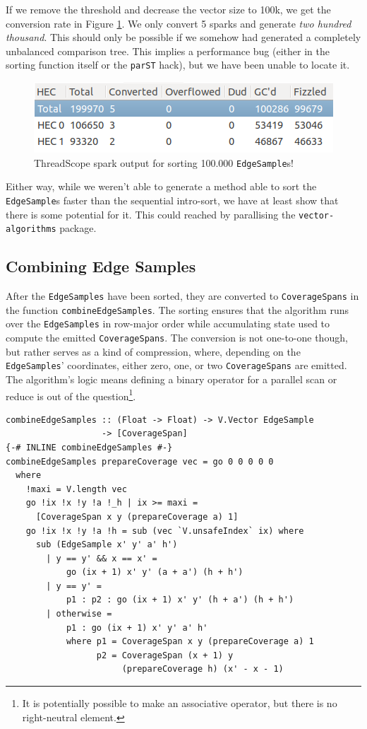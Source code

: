 \documentclass[12pt, a4paper]{article}
\begin{document}
If we remove the threshold and decrease the vector size to 100k, we get the conversion rate in
Figure \ref{fig:sorting-thread-100k-sparks}. We only convert 5 sparks and generate \textit{two hundred thousand}. This should only be possible if we somehow had generated
a completely unbalanced comparison tree. This implies a performance bug (either in the sorting function
 itself or the \texttt{parST} hack), but we have been unable to locate it.
 \begin{figure}[h!]
  \centering
  \includegraphics[width=0.6\linewidth]{../threadscope/sorting/sorting-100k-sparks}
  \caption{ThreadScope spark output for sorting 100.000 \texttt{EdgeSample}s!}
  \label{fig:sorting-thread-100k-sparks}
\end{figure}

Either way, while we weren't able to generate a method able to sort the \texttt{EdgeSample}s faster
than the sequential intro-sort, we have at least show that there is some potential for it. This
 could reached by parallising the \texttt{vector-algorithms} package.
 
\subsection{Combining Edge Samples}

After the \texttt{EdgeSamples} have been sorted, they are converted to \texttt{CoverageSpans} in the function \texttt{combineEdgeSamples}. The sorting ensures that the algorithm runs over the \texttt{EdgeSamples} in row-major order while accumulating state used to compute the emitted \texttt{CoverageSpans}. The conversion is not one-to-one though, but rather serves as a kind of compression, where, depending on the \texttt{EdgeSamples}' coordinates, either zero, one, or two \texttt{CoverageSpans} are emitted. The algorithm's logic means defining a binary operator for a parallel scan or reduce is out of the question\footnote{It is potentially possible to make an associative operator, but there is no right-neutral element.}.

\begin{lstlisting}[caption={Combining the edge samples.}]
combineEdgeSamples :: (Float -> Float) -> V.Vector EdgeSample
                   -> [CoverageSpan]
{-# INLINE combineEdgeSamples #-}
combineEdgeSamples prepareCoverage vec = go 0 0 0 0 0
  where
    !maxi = V.length vec
    go !ix !x !y !a !_h | ix >= maxi =
      [CoverageSpan x y (prepareCoverage a) 1]
    go !ix !x !y !a !h = sub (vec `V.unsafeIndex` ix) where
      sub (EdgeSample x' y' a' h')
        | y == y' && x == x' =
            go (ix + 1) x' y' (a + a') (h + h')
        | y == y' =
            p1 : p2 : go (ix + 1) x' y' (h + a') (h + h')
        | otherwise =
            p1 : go (ix + 1) x' y' a' h'
            where p1 = CoverageSpan x y (prepareCoverage a) 1
                  p2 = CoverageSpan (x + 1) y
                       (prepareCoverage h) (x' - x - 1)
\end{lstlisting}
\end{document}
